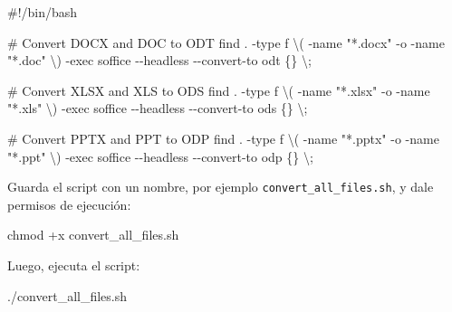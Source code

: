 \documentclass[
  jou,
  floatsintext,
  longtable,
  a4paper,
  nolmodern,
  notxfonts,
  notimes,
  12pt,
  colorlinks=true,linkcolor=blue,citecolor=blue,urlcolor=blue]{apa7}
\newenvironment{Shaded}{\begin{snugshade}}{\end{snugshade}}
\newcommand{\AttributeTok}[1]{\textcolor[rgb]{0.40,0.45,0.13}{#1}}
\newcommand{\CommentTok}[1]{\textcolor[rgb]{0.37,0.37,0.37}{#1}}
\newcommand{\DataTypeTok}[1]{\textcolor[rgb]{0.68,0.00,0.00}{#1}}
\newcommand{\ExtensionTok}[1]{\textcolor[rgb]{0.00,0.23,0.31}{#1}}
\newcommand{\FunctionTok}[1]{\textcolor[rgb]{0.28,0.35,0.67}{#1}}
\newcommand{\NormalTok}[1]{\textcolor[rgb]{0.00,0.23,0.31}{#1}}
\newcommand{\StringTok}[1]{\textcolor[rgb]{0.13,0.47,0.30}{#1}}
\begin{document}
\begin{Shaded}
\begin{Highlighting}[]
\CommentTok{\#!/bin/bash}

\CommentTok{\# Convert DOCX and DOC to ODT}
\FunctionTok{find}\NormalTok{ . }\AttributeTok{{-}type}\NormalTok{ f }\DataTypeTok{\textbackslash{}(} \AttributeTok{{-}name} \StringTok{"*.docx"} \AttributeTok{{-}o} \AttributeTok{{-}name} \StringTok{"*.doc"} \DataTypeTok{\textbackslash{})} \AttributeTok{{-}exec}\NormalTok{ soffice }\AttributeTok{{-}{-}headless} \AttributeTok{{-}{-}convert{-}to}\NormalTok{ odt \{\} }\DataTypeTok{\textbackslash{};}

\CommentTok{\# Convert XLSX and XLS to ODS}
\FunctionTok{find}\NormalTok{ . }\AttributeTok{{-}type}\NormalTok{ f }\DataTypeTok{\textbackslash{}(} \AttributeTok{{-}name} \StringTok{"*.xlsx"} \AttributeTok{{-}o} \AttributeTok{{-}name} \StringTok{"*.xls"} \DataTypeTok{\textbackslash{})} \AttributeTok{{-}exec}\NormalTok{ soffice }\AttributeTok{{-}{-}headless} \AttributeTok{{-}{-}convert{-}to}\NormalTok{ ods \{\} }\DataTypeTok{\textbackslash{};}

\CommentTok{\# Convert PPTX and PPT to ODP}
\FunctionTok{find}\NormalTok{ . }\AttributeTok{{-}type}\NormalTok{ f }\DataTypeTok{\textbackslash{}(} \AttributeTok{{-}name} \StringTok{"*.pptx"} \AttributeTok{{-}o} \AttributeTok{{-}name} \StringTok{"*.ppt"} \DataTypeTok{\textbackslash{})} \AttributeTok{{-}exec}\NormalTok{ soffice }\AttributeTok{{-}{-}headless} \AttributeTok{{-}{-}convert{-}to}\NormalTok{ odp \{\} }\DataTypeTok{\textbackslash{};}
\end{Highlighting}
\end{Shaded}

Guarda el script con un nombre, por ejemplo
\texttt{convert\_all\_files.sh}, y dale permisos de ejecución:

\begin{Shaded}
\begin{Highlighting}[]
\FunctionTok{chmod}\NormalTok{ +x convert\_all\_files.sh}
\end{Highlighting}
\end{Shaded}

Luego, ejecuta el script:

\begin{Shaded}
\begin{Highlighting}[]
\ExtensionTok{./convert\_all\_files.sh}
\end{Highlighting}
\end{Shaded}
\end{document}
